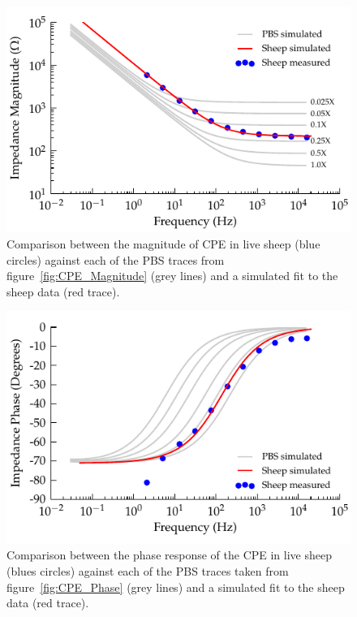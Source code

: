 \documentclass[journal, a4paper]{IEEEtran}
\begin{document}
{\begin{figure}
    \begin{center}
        \includegraphics{graphics/displacement-withSheep_impedanceVsFrequency_magnitude}
    \end{center}
    \caption{Comparison between the magnitude of CPE in live sheep (blue circles) against each of the PBS traces from figure~\ref{fig:CPE_Magnitude} (grey lines) and a simulated fit to the sheep data (red trace).}
    \label{fig:displacement_sheepCPEMagnitude}
\end{figure}

\begin{figure}
    \begin{center}
        \includegraphics{graphics/displacement-withSheep_impedanceVsFrequency_phase}
    \end{center}
    \caption{Comparison between the phase response of the CPE in live sheep (blues circles) against each of the PBS traces taken from figure~\ref{fig:CPE_Phase} (grey lines) and a simulated fit to the sheep data (red trace).}
    \label{fig:displacement_sheepCPEPhase}
\end{figure}

}
\end{document}
